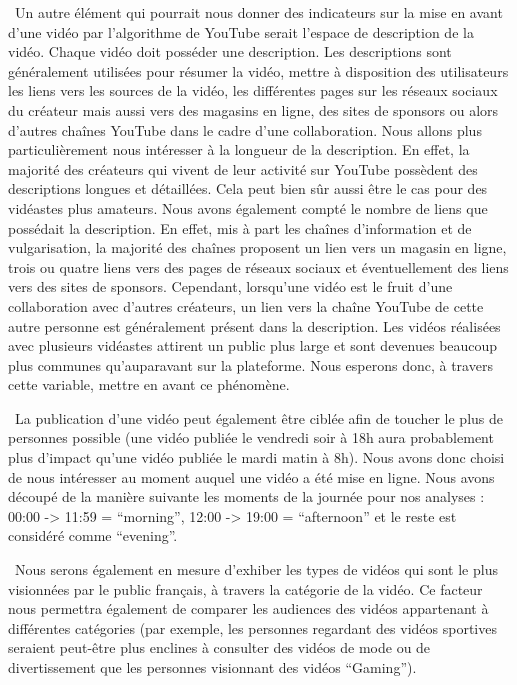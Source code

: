 \documentclass[
]{article}
\begin{document}
 Un autre élément qui pourrait nous donner des indicateurs sur la mise
en avant d'une vidéo par l'algorithme de YouTube serait l'espace de
description de la vidéo. Chaque vidéo doit posséder une description. Les
descriptions sont généralement utilisées pour résumer la vidéo, mettre à
disposition des utilisateurs les liens vers les sources de la vidéo, les
différentes pages sur les réseaux sociaux du créateur mais aussi vers
des magasins en ligne, des sites de sponsors ou alors d'autres chaînes
YouTube dans le cadre d'une collaboration. Nous allons plus
particulièrement nous intéresser à la longueur de la description. En
effet, la majorité des créateurs qui vivent de leur activité sur YouTube
possèdent des descriptions longues et détaillées. Cela peut bien sûr
aussi être le cas pour des vidéastes plus amateurs. Nous avons également
compté le nombre de liens que possédait la description. En effet, mis à
part les chaînes d'information et de vulgarisation, la majorité des
chaînes proposent un lien vers un magasin en ligne, trois ou quatre
liens vers des pages de réseaux sociaux et éventuellement des liens vers
des sites de sponsors. Cependant, lorsqu'une vidéo est le fruit d'une
collaboration avec d'autres créateurs, un lien vers la chaîne YouTube de
cette autre personne est généralement présent dans la description. Les
vidéos réalisées avec plusieurs vidéastes attirent un public plus large
et sont devenues beaucoup plus communes qu'auparavant sur la plateforme.
Nous esperons donc, à travers cette variable, mettre en avant ce
phénomène.

 La publication d'une vidéo peut également être ciblée afin de toucher
le plus de personnes possible (une vidéo publiée le vendredi soir à 18h
aura probablement plus d'impact qu'une vidéo publiée le mardi matin à
8h). Nous avons donc choisi de nous intéresser au moment auquel une
vidéo a été mise en ligne. Nous avons découpé de la manière suivante les
moments de la journée pour nos analyses : 00:00 -\textgreater{} 11:59 =
``morning'', 12:00 -\textgreater{} 19:00 = ``afternoon'' et le reste est
considéré comme ``evening''.

 Nous serons également en mesure d'exhiber les types de vidéos qui sont
le plus visionnées par le public français, à travers la catégorie de la
vidéo. Ce facteur nous permettra également de comparer les audiences des
vidéos appartenant à différentes catégories (par exemple, les personnes
regardant des vidéos sportives seraient peut-être plus enclines à
consulter des vidéos de mode ou de divertissement que les personnes
visionnant des vidéos ``Gaming'').
\end{document}
